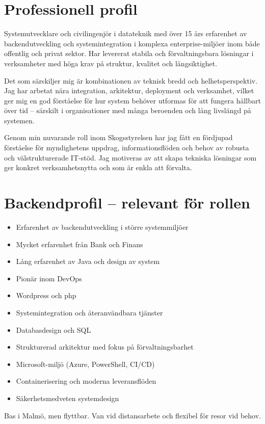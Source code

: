 \section*{Professionell profil}

Systemutvecklare och civilingenjör i datateknik med över 15 års erfarenhet av backendutveckling och systemintegration i komplexa enterprise-miljöer inom både offentlig och privat sektor. Har levererat stabila och förvaltningsbara lösningar i verksamheter med höga krav på struktur, kvalitet och långsiktighet.

Det som särskiljer mig är kombinationen av teknisk bredd och helhetsperspektiv. Jag har arbetat nära integration, arkitektur, deployment och verksamhet, vilket ger mig en god förståelse för hur system behöver utformas för att fungera hållbart över tid – särskilt i organisationer med många beroenden och lång livslängd på systemen.

Genom min nuvarande roll inom Skogsstyrelsen har jag fått en fördjupad förståelse för myndighetens uppdrag, informationsflöden och behov av robusta och välstrukturerade IT-stöd. Jag motiveras av att skapa tekniska lösningar som ger konkret verksamhetsnytta och som är enkla att förvalta.

\section*{Backendprofil – relevant för rollen}

\begin{itemize}[noitemsep]
  \item Erfarenhet av backendutveckling i större systemmiljöer
   \item Mycket erfarenhet från Bank och Finans
  \item Lång erfarenhet av Java och design av system
  \item Pionär inom DevOps
  \item Wordpress och php
  \item Systemintegration och återanvändbara tjänster
  \item Databasdesign och SQL
  \item Strukturerad arkitektur med fokus på förvaltningsbarhet
  \item Microsoft-miljö (Azure, PowerShell, CI/CD)
  \item Containerisering och moderna leveransflöden
  \item Säkerhetsmedveten systemdesign
\end{itemize}


Bas i Malmö, men flyttbar. Van vid distansarbete och flexibel för resor vid behov.
